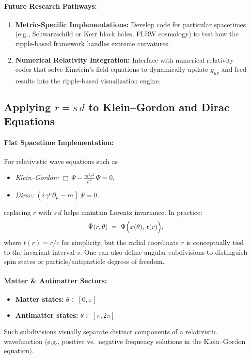 \paragraph{Future Research Pathways:}
\begin{enumerate}
    \item \textbf{Metric-Specific Implementations:}
    Develop code for particular spacetimes (e.g., Schwarzschild or Kerr black holes, FLRW cosmology) to test how the ripple-based framework handles extreme curvatures.
    \item \textbf{Numerical Relativity Integration:}
    Interface with numerical relativity codes that solve Einstein’s field equations to dynamically update \(g_{\mu\nu}\) and feed results into the ripple-based visualization engine.
\end{enumerate}

\subsection{Applying \texorpdfstring{$r=s\,d$}{r=s d} to Klein--Gordon and Dirac Equations}

\paragraph{Flat Spacetime Implementation:}
For relativistic wave equations such as
\begin{itemize}
    \item \textit{Klein--Gordon:}
    \(\Box \,\Psi - \tfrac{m^2 c^2}{\hbar^2} \,\Psi = 0,\)
    \item \textit{Dirac:}
    \((i\,\gamma^\mu \partial_\mu - m)\,\Psi = 0,\)
\end{itemize}
replacing \(r\) with \(s\,d\) helps maintain Lorentz invariance. In practice:
\[
\tilde{\Psi}(r,\theta) \;=\; \Psi\Bigl(x(\theta),\,t(r)\Bigr),
\]
where \(t(r) = r/c\) for simplicity, but the radial coordinate \(r\) is conceptually tied to the invariant interval \(s\). One can also define angular subdivisions to distinguish spin states or particle/antiparticle degrees of freedom.

\paragraph{Matter \& Antimatter Sectors:}
\begin{itemize}
    \item \textbf{Matter states:} \(\theta \in [0,\pi]\)
    \item \textbf{Antimatter states:} \(\theta \in [\pi,2\pi]\)
\end{itemize}
Such subdivisions visually separate distinct components of a relativistic wavefunction (e.g., positive vs.\ negative frequency solutions in the Klein--Gordon equation).

